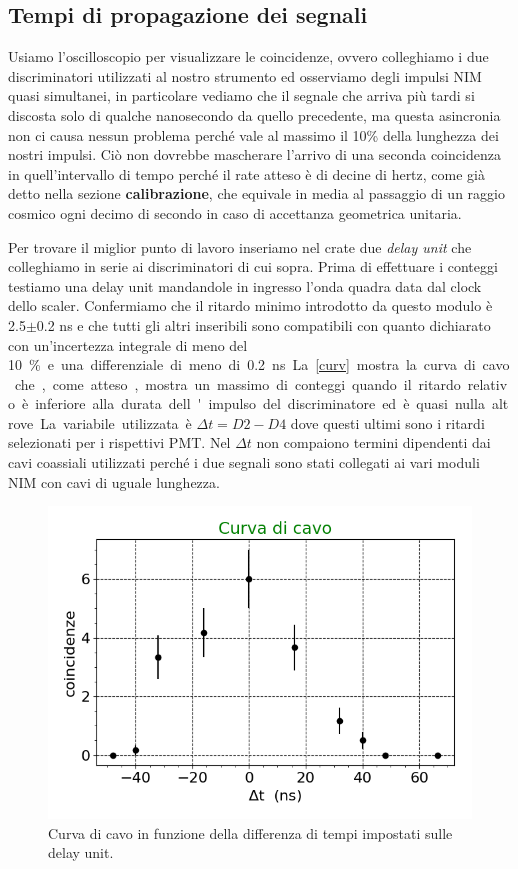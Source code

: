 \documentclass[a4paper]{article}
\begin{document}
\subsection*{Tempi di propagazione dei segnali}

Usiamo l'oscilloscopio per visualizzare le coincidenze, ovvero colleghiamo i due discriminatori utilizzati al nostro strumento ed osserviamo degli impulsi NIM quasi simultanei, in particolare vediamo che il segnale che arriva più tardi si discosta solo di qualche nanosecondo da quello precedente, ma questa asincronia non ci causa nessun problema perché vale al massimo il 10\% della lunghezza dei nostri impulsi.
Ciò non dovrebbe mascherare l'arrivo di una seconda coincidenza in quell'intervallo di tempo perché il rate atteso è di decine di hertz, come già detto nella sezione \textbf{calibrazione}, che equivale in media al passaggio di un raggio cosmico ogni decimo di secondo in caso di accettanza geometrica unitaria.

Per trovare il miglior punto di lavoro inseriamo nel crate due \emph{delay unit} che colleghiamo in serie ai discriminatori di cui sopra. Prima di effettuare i conteggi testiamo una delay unit mandandole in ingresso l'onda quadra data dal clock dello scaler. Confermiamo che il ritardo minimo introdotto da questo modulo è 2.5$\pm$0.2\! ns e che tutti gli altri inseribili sono compatibili con quanto dichiarato con un'incertezza integrale di meno del \SI{10}\% e una differenziale di meno di \SI{0.2}{ns}. La \autoref{curv} mostra la curva di cavo che, come atteso, mostra un massimo di conteggi quando il ritardo relativo è inferiore alla durata dell'impulso del discriminatore ed è quasi nulla altrove. La variabile utilizzata è $\Delta t=D2-D4$ dove questi ultimi sono i ritardi selezionati per i rispettivi PMT. Nel $\Delta t$ non compaiono termini dipendenti dai cavi coassiali utilizzati perché i due segnali sono stati collegati ai vari moduli NIM con cavi di uguale lunghezza.

\begin{figure}[h]
\centering
\includegraphics[width=8 cm]{curva_cavo}
\caption{Curva di cavo in funzione della differenza di tempi impostati sulle delay unit.}
\label{curv}
\end{figure}
\end{document}
